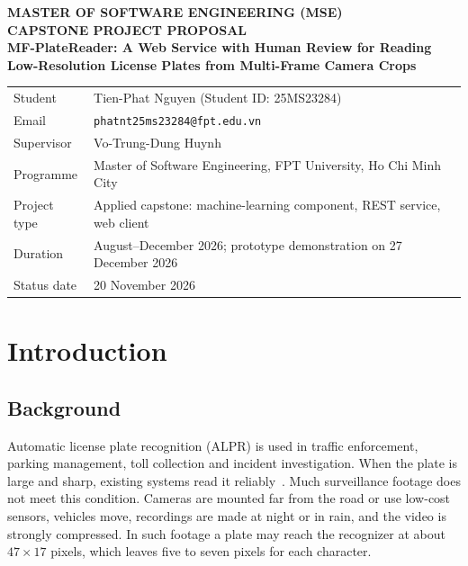 \documentclass[11pt,a4paper]{article}
\begin{document}
\begin{center}
{\large\bfseries MASTER OF SOFTWARE ENGINEERING (MSE)}\\[2pt]
{\bfseries CAPSTONE PROJECT PROPOSAL}\\[10pt]
{\Large\bfseries MF-PlateReader: A Web Service with Human Review for Reading\\[2pt]
Low-Resolution License Plates from Multi-Frame Camera Crops}
\end{center}

\vspace{4pt}
\begin{tabularx}{\textwidth}{@{}P{3.3cm}L@{}}
\toprule
Student & Tien-Phat Nguyen \quad (Student ID: 25MS23284) \\
Email & \texttt{phatnt25ms23284@fpt.edu.vn} \\
Supervisor & Vo-Trung-Dung Huynh \\
Programme & Master of Software Engineering, FPT University, Ho Chi Minh City \\
Project type & Applied capstone: machine-learning component, REST service, web client \\
Duration & August--December 2026; prototype demonstration on 27 December 2026 \\
Status date & 20 November 2026 \\
\bottomrule
\end{tabularx}

\section{Introduction}

\subsection{Background}

Automatic license plate recognition (ALPR) is used in traffic enforcement, parking management, toll collection and incident investigation. When the plate is large and sharp, existing systems read it reliably~\cite{laroca2021efficient,shi2017crnn,ke2023ultrafast}. Much surveillance footage does not meet this condition. Cameras are mounted far from the road or use low-cost sensors, vehicles move, recordings are made at night or in rain, and the video is strongly compressed. In such footage a plate may reach the recognizer at about $47\times17$ pixels, which leaves five to seven pixels for each character.
\end{document}
